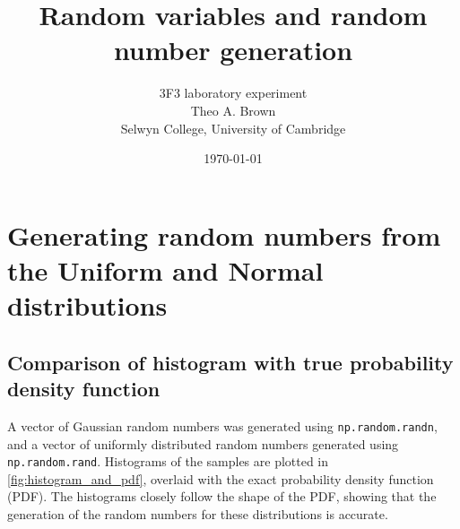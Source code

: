 \documentclass[a4paper]{article}
\begin{document}

\title{Random variables and random number generation}
\author{3F3 laboratory experiment \\ Theo A. Brown \\ Selwyn College, University of Cambridge}
\date{\today}
\maketitle

\tableofcontents


\section{Generating random numbers from the Uniform and Normal distributions}
\label{sec:uniform_normal}


\subsection{Comparison of histogram with true probability density function}

A vector of Gaussian random numbers was generated using \verb`np.random.randn`, and a vector of uniformly distributed
random numbers generated using \verb`np.random.rand`. Histograms of the samples are plotted in
\autoref{fig:histogram_and_pdf}, overlaid with the exact probability density function (PDF). The histograms closely
follow the shape of the PDF, showing that the generation of the random numbers for these distributions is accurate.
\end{document}

